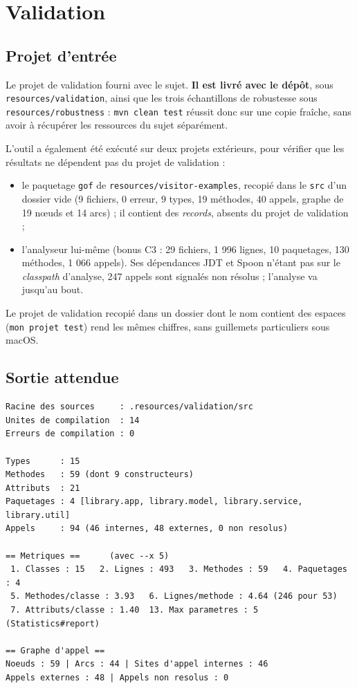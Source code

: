 \documentclass[11pt,a4paper]{article}
\begin{document}
\section{Validation}

\subsection*{Projet d'entrée}

Le projet de validation fourni avec le sujet. \textbf{Il est livré avec le dépôt}, sous \texttt{resources/validation}, ainsi que les trois échantillons de robustesse sous \texttt{resources/robustness} : \texttt{mvn clean test} réussit donc sur une copie fraîche, sans avoir à récupérer les ressources du sujet séparément.

L'outil a également été exécuté sur deux projets extérieurs, pour vérifier que les résultats ne dépendent pas du projet de validation :

\begin{itemize}
\item le paquetage \texttt{gof} de \texttt{resources/visitor-examples}, recopié dans le \texttt{src} d'un dossier vide (9 fichiers, 0 erreur, 9 types, 19 méthodes, 40 appels, graphe de 19 n\oe{}uds et 14 arcs) ; il contient des \textit{records}, absents du projet de validation ;
\item l'analyseur lui-même (bonus C3 : 29 fichiers, 1 996 lignes, 10 paquetages, 130 méthodes, 1 066 appels). Ses dépendances JDT et Spoon n'étant pas sur le \textit{classpath} d'analyse, 247 appels sont signalés non résolus ; l'analyse va jusqu'au bout.
\end{itemize}

Le projet de validation recopié dans un dossier dont le nom contient des espaces (\texttt{mon projet test}) rend les mêmes chiffres, sans guillemets particuliers sous macOS.

\subsection*{Sortie attendue}

\begin{lstlisting}
Racine des sources     : .resources/validation/src
Unites de compilation  : 14
Erreurs de compilation : 0

Types      : 15
Methodes   : 59 (dont 9 constructeurs)
Attributs  : 21
Paquetages : 4 [library.app, library.model, library.service, library.util]
Appels     : 94 (46 internes, 48 externes, 0 non resolus)

== Metriques ==      (avec --x 5)
 1. Classes : 15   2. Lignes : 493   3. Methodes : 59   4. Paquetages : 4
 5. Methodes/classe : 3.93   6. Lignes/methode : 4.64 (246 pour 53)
 7. Attributs/classe : 1.40  13. Max parametres : 5 (Statistics#report)

== Graphe d'appel ==
Noeuds : 59 | Arcs : 44 | Sites d'appel internes : 46
Appels externes : 48 | Appels non resolus : 0
\end{lstlisting}
\end{document}
